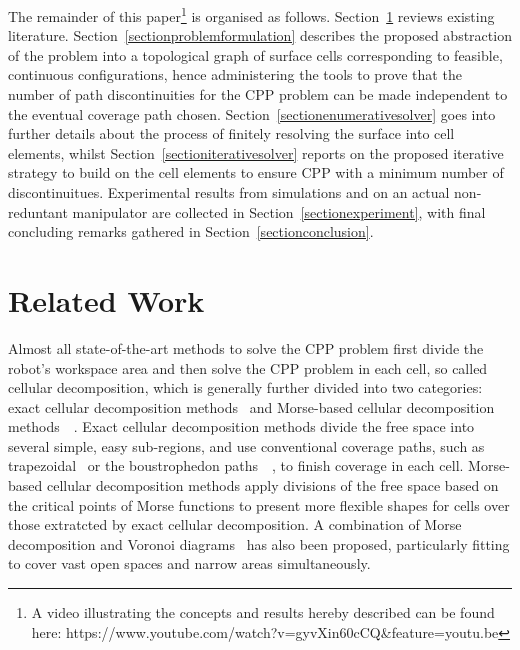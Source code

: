 \documentclass[journal]{IEEEtran}
\begin{document}
The remainder of this paper\footnote{A video illustrating the concepts and results hereby described can be found here: https://www.youtube.com/watch?v=gyvXin60cCQ\&feature=youtu.be} 
is organised as follows. Section~\ref{sectionrelatedwork} reviews existing literature. 
Section~\ref{sectionproblemformulation} describes the proposed abstraction of the problem into a topological graph of surface cells corresponding 
to feasible, continuous configurations, hence administering the tools to prove that the number of path discontinuities for the CPP problem can be made independent to the eventual coverage path chosen. %
Section~\ref{sectionenumerativesolver} goes into further details about the process of finitely resolving the surface into cell elements, whilst 
Section~\ref{sectioniterativesolver} reports on the proposed iterative strategy to build on the cell elements to ensure CPP with a minimum number of discontinuitues. Experimental results from simulations and on an actual non-reduntant manipulator are collected in Section~\ref{sectionexperiment}, with final concluding remarks gathered in Section~\ref{sectionconclusion}. 


\section{Related Work}\label{sectionrelatedwork}
Almost all state-of-the-art methods to solve the CPP problem first divide the robot's workspace area and then solve the CPP problem in each cell, so called cellular decomposition, which is generally further divided into two categories: exact cellular decomposition methods~\cite{lumelsky1990dynamic} and Morse-based cellular decomposition methods~\cite{choset2000exact}~\cite{Acar2002Morse}. 
Exact cellular decomposition methods divide the free space into several simple, easy sub-regions, and use conventional coverage paths, such as trapezoidal~\cite{choset2005principles} or the boustrophedon paths~\cite{choset1998coverage}~\cite{choset2000coverage}, to finish coverage in each cell. 
Morse-based cellular decomposition methods apply divisions of the free space based on the critical points of Morse functions to present more flexible shapes for cells over those extratcted by exact cellular decomposition. 
A combination of Morse decomposition and Voronoi diagrams~\cite{choset2000sensor-based} has also been proposed, particularly fitting to 
cover vast open spaces and narrow areas simultaneously.
\end{document}
